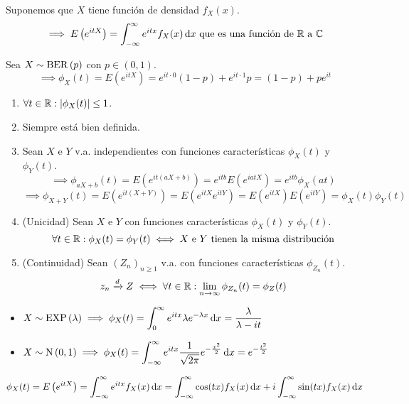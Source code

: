  Suponemos que $X$ tiene función de densidad $f_X(x)$.
\[\implies E\left(e^{itX}\right) = \int_{-\infty}^{\infty} e^{itx}f_X(x)\odif{x} \tex{ que es una función de $\R$ a $\C$}\]

\begin{ejem}
	Sea $X\sim\operatorname{BER}\left(p\right)$ con $p\in(0,1)$.
	\[\implies \phi_X(t) = E\left(e^{itX}\right) = e^{it\cdot 0}(1-p) + e^{it\cdot 1}p = (1-p) + p e^{it}\] %
\end{ejem}

\begin{enumerate}
	\item $\displaystyle \forall t \in \mathbb{R} : \left|\phi_X(t)\right| \leq 1$.
	\item Siempre está bien definida.
	\item Sean $X$ e $Y$ v.a. independientes con funciones características $\phi_X(t)$ y $\phi_Y(t)$.
	      \[\implies \phi_{aX+b}(t) = E\left(e^{it(aX+b)}\right) = e^{itb}E\left(e^{iatX}\right) = e^{itb}\phi_X(at)\]
	      \[\implies \phi_{X+Y}(t) = E\left(e^{it(X+Y)}\right) = E\left(e^{itX}e^{itY}\right) = E\left(e^{itX}\right)E\left(e^{itY}\right) = \phi_X(t)\phi_Y(t)\]
	\item (Unicidad) Sean $X$ e $Y$ con funciones características $\phi_X(t)$ y $\phi_Y(t)$.
	      \[\forall t \in \mathbb{R} :  \phi_X(t) = \phi_Y(t) \iff \text{$X$ e $Y$ tienen la misma distribución}\]
	\item (Continuidad) Sean $\left(Z_n\right)_{n\geq 1}$ v.a. con funciones características $\phi_{Z_n}(t)$.
	      \[z_n \xrightarrow{d} Z \iff \forall t \in \mathbb{R} : \lim_{n\to\infty} \phi_{Z_n}(t) = \phi_Z(t)\]
\end{enumerate}

\begin{ejem}
	\begin{itemize} %
		\item $\ds X\sim\EXP{\lambda} \implies \phi_X(t) = \int_{0}^{\infty} e^{itx}\lambda e^{-\lambda x}\odif{x} = \frac{\lambda}{\lambda - it}$
		\item $\ds X\sim\normal{0,1} \implies \phi_X(t) = \int_{-\infty}^{\infty} e^{itx}\frac{1}{\sqrt{2\pi}}e^{-\frac{x^2}{2}}\odif{x} = e^{-\frac{t^2}{2}}$
	\end{itemize}
\end{ejem}


\[\phi_X(t) = E\left(e^{itX}\right) = \int_{-\infty}^{\infty} e^{itx}f_X(x)\odif{x} = \int_{-\infty}^{\infty} \cos(tx)f_X(x)\odif{x} + i\int_{-\infty}^{\infty} \sin(tx)f_X(x)\odif{x}\]

